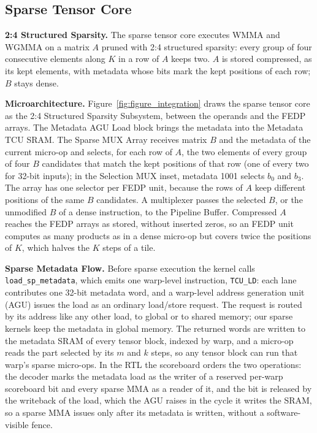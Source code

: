 \subsection{Sparse Tensor Core}\label{sec:design_sparse}

\textbf{2:4 Structured Sparsity.} The sparse tensor core executes WMMA and WGMMA on a matrix $A$ pruned with 2:4 structured sparsity: every group of four consecutive elements along $K$ in a row of $A$ keeps two. $A$ is stored compressed, as its kept elements, with metadata whose bits mark the kept positions of each row; $B$ stays dense.

\textbf{Microarchitecture.} Figure~\ref{fig:figure_integration} draws the sparse tensor core as the 2:4 Structured Sparsity Subsystem, between the operands and the FEDP arrays. The Metadata AGU Load block brings the metadata into the Metadata TCU SRAM. The Sparse MUX Array receives matrix $B$ and the metadata of the current micro-op and selects, for each row of $A$, the two elements of every group of four $B$ candidates that match the kept positions of that row (one of every two for 32-bit inputs); in the Selection MUX inset, metadata 1001 selects $b_0$ and $b_3$. The array has one selector per FEDP unit, because the rows of $A$ keep different positions of the same $B$ candidates. A multiplexer passes the selected $B$, or the unmodified $B$ of a dense instruction, to the Pipeline Buffer. Compressed $A$ reaches the FEDP arrays as stored, without inserted zeros, so an FEDP unit computes as many products as in a dense micro-op but covers twice the positions of $K$, which halves the $K$ steps of a tile.

\textbf{Sparse Metadata Flow.} Before sparse execution the kernel calls \texttt{load\_sp\_metadata}, which emits one warp-level instruction, \texttt{TCU\_LD}: each lane contributes one 32-bit metadata word, and a warp-level address generation unit (AGU) issues the load as an ordinary load/store request. The request is routed by its address like any other load, to global or to shared memory; our sparse kernels keep the metadata in global memory. The returned words are written to the metadata SRAM of every tensor block, indexed by warp, and a micro-op reads the part selected by its $m$ and $k$ steps, so any tensor block can run that warp's sparse micro-ops. In the RTL the scoreboard orders the two operations: the decoder marks the metadata load as the writer of a reserved per-warp scoreboard bit and every sparse MMA as a reader of it, and the bit is released by the writeback of the load, which the AGU raises in the cycle it writes the SRAM, so a sparse MMA issues only after its metadata is written, without a software-visible fence.

